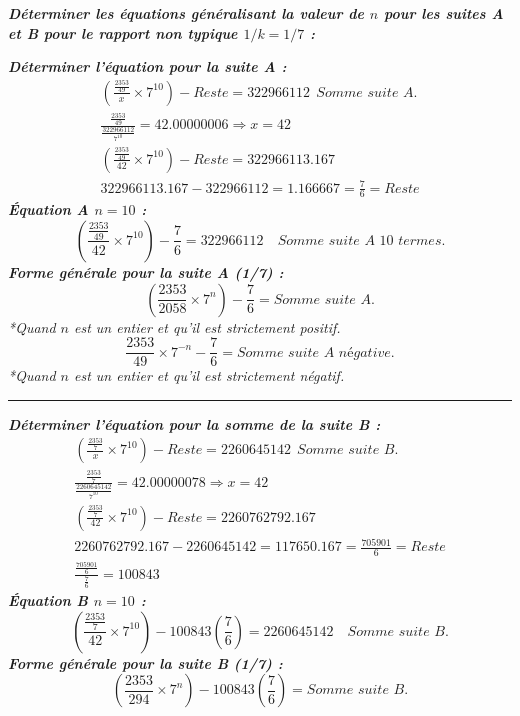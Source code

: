 \documentclass[11pt,a4paper]{article}
\begin{document}
\noindent\textbf{\textit{Déterminer les équations généralisant la valeur de $n$ pour les suites A et B pour le rapport non typique $1/k=1/7$ :}}

\noindent\textbf{\textit{Déterminer l’équation pour la suite A :}}
\begin{gather*}
\left(\frac{\frac{2353}{49}}{x}\times7^{10}\right)-\textit{Reste}=322966112\ \ \textit{Somme suite A.}\\
\frac{\frac{2353}{49}}{\frac{322966112}{7^{10}}}=42.00000006\Longrightarrow x=42\\
\left(\frac{\frac{2353}{49}}{42}\times7^{10}\right)-\textit{Reste}=322966113.167\\
322966113.167-322966112=1.166667=\frac{7}{6}=\textit{Reste}
\end{gather*}
\noindent\textbf{\textit{Équation A $n=10$ :}}
\[
\left(\frac{\frac{2353}{49}}{42}\times7^{10}\right)-\frac{7}{6}=322966112\quad\textit{Somme suite A 10 termes.}
\]
\noindent\textbf{\textit{Forme générale pour la suite A (1/7) :}}
\[
\left(\frac{2353}{2058}\times7^{n}\right)-\frac{7}{6}=\textit{Somme suite A.}
\]
\noindent\textit{*Quand $n$ est un entier et qu'il est strictement positif.}
\[
\frac{2353}{49}\times7^{-n}-\frac{7}{6}=\textit{Somme suite A négative.}
\]
\noindent\textit{*Quand $n$ est un entier et qu'il est strictement négatif.}

\noindent\rule{\linewidth}{0.4pt}

\noindent\textbf{\textit{Déterminer l’équation pour la somme de la suite B :}}
\begin{gather*}
\left(\frac{\frac{2353}{7}}{x}\times7^{10}\right)-\textit{Reste}=2260645142\ \ \textit{Somme suite B.}\\
\frac{\frac{2353}{7}}{\frac{2260645142}{7^{10}}}=42.00000078\Longrightarrow x=42\\
\left(\frac{\frac{2353}{7}}{42}\times7^{10}\right)-\textit{Reste}=2260762792.167\\
2260762792.167-2260645142=117650.167=\frac{705901}{6}=\textit{Reste}\\
\frac{\frac{705901}{6}}{\frac{7}{6}}=100843
\end{gather*}
\noindent\textbf{\textit{Équation B $n=10$ :}}
\[
\left(\frac{\frac{2353}{7}}{42}\times7^{10}\right)-100843\left(\frac{7}{6}\right)=2260645142\quad\textit{Somme suite B.}
\]
\noindent\textbf{\textit{Forme générale pour la suite B (1/7) :}}
\[
\left(\frac{2353}{294}\times7^{n}\right)-100843\left(\frac{7}{6}\right)=\textit{Somme suite B.}
\]
\end{document}
